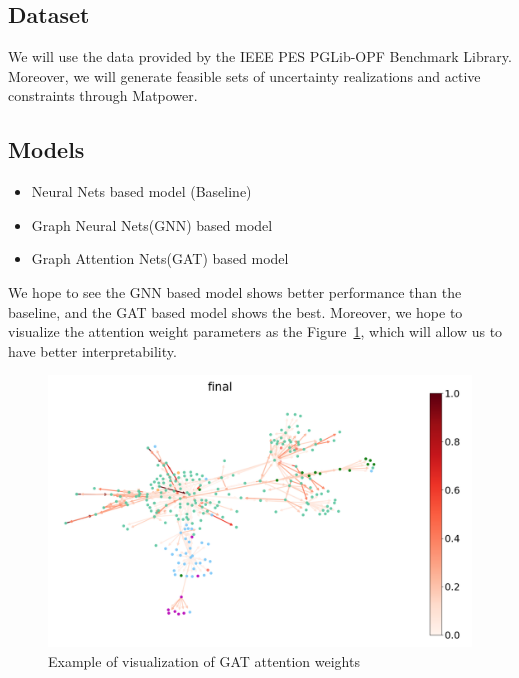 \documentclass [11pt]{article}
\begin{document}


\subsection{Dataset}

We will use the data provided by the IEEE PES PGLib-OPF Benchmark Library\cite{power-grid-lib}. Moreover, we will generate feasible sets of uncertainty realizations and active constraints through Matpower\cite{matpower}. 


\subsection{Models}

\begin{itemize}
  \item Neural Nets based model (Baseline)
  \item Graph Neural Nets(GNN) based model
  \item Graph Attention Nets(GAT) based model
\end{itemize}

We hope to see the GNN based model shows better performance than the baseline, and the GAT based model shows the best. Moreover, we hope to visualize the attention weight parameters as the Figure~\ref{fig:eg vis}, which will allow us to have better interpretability.

\begin{figure}[h]

\end{figure}


\begin{figure}[ht]
	\centering
	\includegraphics[scale=0.1]{etc/proposal/figures/eg of visualize gat attention weights.png}
	\caption{Example of visualization of GAT attention weights\cite{gat_eg}}
    \label{fig:eg vis}
\end{figure}
\end{document}
